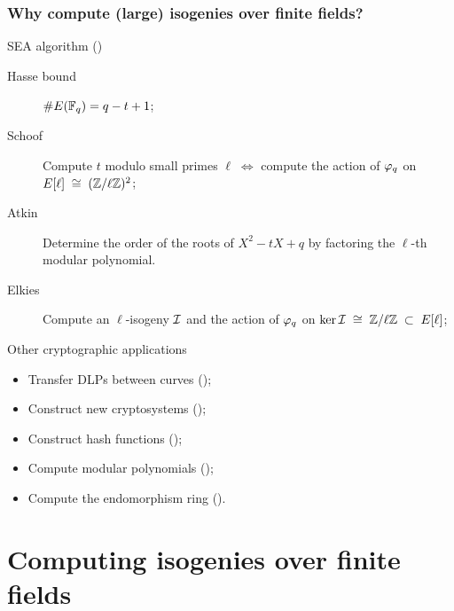 \documentclass[10pt,usepdftitle=false]{beamer}
\begin{document}

\begin{frame}
  \frametitle{Why compute (large) isogenies over finite fields?}
  
  \begin{block}{SEA algorithm (\cite{schoof85,elkies92,atkin88})}
    \begin{description}
    \item[Hasse bound] \hfill{\large\emph{$\# E(\mathbb{F}_q)= q-t+1$}};\hfill\strut
    \item[Schoof] Compute $t$ modulo small primes
      $\ell\;\Leftrightarrow$ compute the action of $\varphi_q$ on
      \emph{$E[\ell]\;\cong\;(\mathbb{Z}/\ell\mathbb{Z})^2$};
    \item[Atkin] Determine the order of the roots of $X^2 -tX +q$ by
      factoring the $\ell$-th modular polynomial.
    \item[Elkies] Compute an $\ell$-isogeny $\mathcal{I}$ and the action of
      $\varphi_q$ on \emph{$\ker\mathcal{I}\;\cong\;\mathbb{Z}/\ell\mathbb{Z}\;\subset\;E[\ell]$};
    \end{description}
  \end{block}

  \begin{block}{Other cryptographic applications}
    \begin{itemize}
    \item Transfer DLPs between curves (\cite{gaudry+hess+smart02,smith09});
    \item Construct new cryptosystems (\cite{teske06,rostovtsev+stolbunov06});
    \item Construct hash functions (\cite{charles+lauter+goren09});
    \item Compute modular polynomials (\cite{sutherland10:modpol});
    \item Compute the endomorphism ring (\cite{kohel,sutherland10:hilbert}).
    \end{itemize}
  \end{block}
\end{frame}


\section{Computing isogenies over finite fields}
\end{document}

